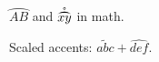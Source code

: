 \documentclass{article}
\begin{document}
$\wideparen{AB}$ and $\widering{xy}$ in math.

Scaled accents: $\widetilde{abc} + \widehat{def}$.
\end{document}

